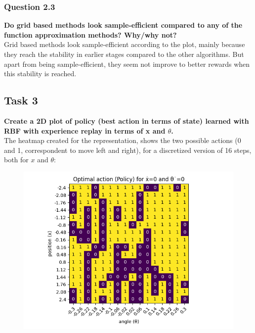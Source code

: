 \documentclass[12pt]{article}
\begin{document}
\subsubsection{Question 2.3}
\textbf{
Do grid based methods look sample-efficient compared to any of the function approximation methods? Why/why not?
}\\

Grid based methods look sample-efficient according to the plot, mainly because they reach the stability in earlier stages compared to the other algorithms. But apart from being sample-efficient, they seem not improve to better rewards when this stability is reached.

\subsection{Task 3}
\textbf{Create a 2D plot of policy (best action in terms of state) learned with RBF
with experience replay in terms of x and $\theta$.} \\

The heatmap created for the representation, shows the two possible actions (0 and 1, correspondent to move left and right), for a discretized version of 16 steps, both for $x$ and $\theta$:

\begin{figure}[h]
    \centering
    \includegraphics[scale=0.75]{exercise-4/plots/task-3.png}
    \label{fig:my_label}
\end{figure}



\end{document}
